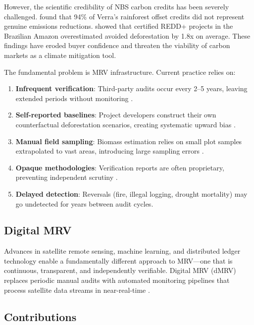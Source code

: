 \documentclass[11pt,a4paper]{article}
\begin{document}
However, the scientific credibility of NBS carbon credits has been
severely challenged. \citet{west2023action} found that 94\% of Verra's
rainforest offset credits did not represent genuine emissions reductions.
\citet{guizar2022carbon} showed that certified REDD+ projects in the
Brazilian Amazon overestimated avoided deforestation by 1.8x on average.
These findings have eroded buyer confidence and threaten the viability of
carbon markets as a climate mitigation tool.

The fundamental problem is MRV infrastructure. Current practice relies
on:

\begin{enumerate}[label=(\roman*)]
  \item \textbf{Infrequent verification}: Third-party audits occur every
    2--5 years, leaving extended periods without monitoring
    \citep{schneider2019double}.
  \item \textbf{Self-reported baselines}: Project developers construct
    their own counterfactual deforestation scenarios, creating systematic
    upward bias \citep{west2023action}.
  \item \textbf{Manual field sampling}: Biomass estimation relies on
    small plot samples extrapolated to vast areas, introducing large
    sampling errors \citep{chave2014improved}.
  \item \textbf{Opaque methodologies}: Verification reports are often
    proprietary, preventing independent scrutiny \citep{badgley2022}.
  \item \textbf{Delayed detection}: Reversals (fire, illegal logging,
    drought mortality) may go undetected for years between audit cycles.
\end{enumerate}

\subsection{Digital MRV}

Advances in satellite remote sensing, machine learning, and distributed
ledger technology enable a fundamentally different approach to MRV---one
that is continuous, transparent, and independently verifiable. Digital
MRV (dMRV) replaces periodic manual audits with automated monitoring
pipelines that process satellite data streams in near-real-time
\citep{fuss2020moving}.

\subsection{Contributions}
\end{document}
